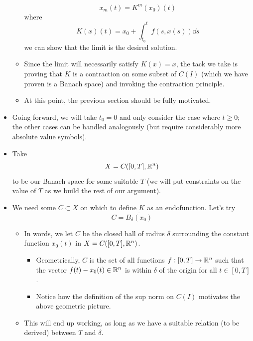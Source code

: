 \documentclass[../notes.tex]{subfiles}
\begin{document}
\begin{itemize}
\begin{itemize}
        \begin{equation*}
            x_m(t) = K^m(x_0)(t)
        \end{equation*}
        where
        \begin{equation*}
            K(x)(t) = x_0+\int_{t_0}^tf(s,x(s))\dd{s}
        \end{equation*}
        we can show that the limit is the desired solution.
        \item Since the limit will necessarily satisfy $K(x)=x$, the tack we take is proving that $K$ is a contraction on some subset of $C(I)$ (which we have proven is a Banach space) and invoking the contraction principle.
        \item At this point, the previous section should be fully motivated.
    \end{itemize}
    \item Going forward, we will take $t_0=0$ and only consider the case where $t\geq 0$; the other cases can be handled analogously (but require considerably more absolute value symbols).
    \item Take
    \begin{equation*}
        X = C([0,T],\mathbb{R}^n)
    \end{equation*}
    to be our Banach space for some suitable $T$ (we will put constraints on the value of $T$ as we build the rest of our argument).
    \item We need some $C\subset X$ on which to define $K$ as an endofunction. Let's try
    \begin{equation*}
        C = \overline{B_\delta(x_0)}
    \end{equation*}
    \begin{itemize}
        \item In words, we let $C$ be the closed ball of radius $\delta$ surrounding the constant function $x_0(t)$ in $X=C([0,T],\mathbb{R}^n)$.
        \begin{itemize}
            \item Geometrically, $C$ is the set of all functions $f:[0,T]\to\mathbb{R}^n$ such that the vector $f(t)-x_0(t)\in\mathbb{R}^n$ is within $\delta$ of the origin for all $t\in[0,T]$.
            \item Notice how the definition of the sup norm on $C(I)$ motivates the above geometric picture.
        \end{itemize}
        \item This will end up working, as long as we have a suitable relation (to be derived) between $T$ and $\delta$.

\end{itemize}
\end{itemize}
\end{document}
